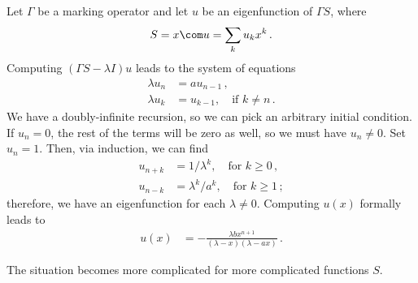\begin{example}
Let $\Gamma$ be a marking operator and let $u$ be an eigenfunction of $\Gamma S$, where 
\begin{align}
	S = x\com u = \sum_k u_k x^k\,.
\end{align}
Computing $(\Gamma S-\lambda I)u$ leads to the system of equations
\begin{align}
	\lambda u_n &= a u_{n-1}\,,\\
	\lambda u_k &= u_{k-1}, \quad \text{if } k \neq n\,.
\end{align}
We have a doubly-infinite recursion, so we can pick an arbitrary initial condition. If $u_n = 0$, the rest of the terms will be zero as well, so we must have $u_n \neq 0$. Set $u_n = 1$. Then, via induction, we can find
\begin{align}
	u_{n+k} &= 1/\lambda^{k}, \quad \text{for $k \ge 0$}\,,\\
	u_{n-k} &= \lambda^{k}/a^k, \quad \text{for $k \ge 1$}\,;
\end{align}
therefore, we have an eigenfunction for each $\lambda \neq 0$. Computing $u(x)$ formally leads to
\begin{align}
	u(x) &=-\frac{\lambda b x^{n+1}}{(\lambda-x)(\lambda-ax)}\,.
\end{align}
\end{example}
The situation becomes more complicated for more complicated functions $S$.

